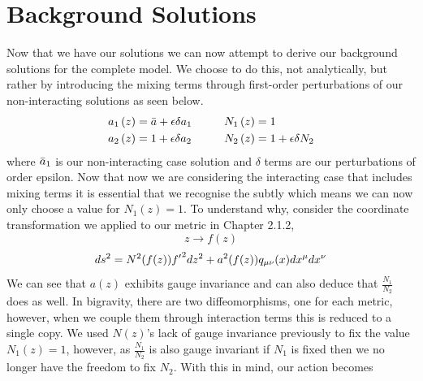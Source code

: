 \documentclass[11pt]{report}
\numberwithin{equation}{chapter}
\begin{document}
\section{Background Solutions}
Now that we have our solutions we can now attempt to derive our background solutions for the complete model. We choose to do this, not analytically, but rather by introducing the mixing terms through first-order perturbations of our non-interacting solutions as seen below.
\begin{equation}
\begin{aligned}[c]
    a_1\left(z\right)&=\Bar{a}+\epsilon\delta a_1 \hspace{1cm}\\
    a_2\left(z\right)&=1  +\epsilon\delta a_2
\end{aligned}
\begin{aligned}[c]
    N_1\left(z\right)&=1 \hspace{1cm}\\
    N_2\left(z\right)&=1+\epsilon\delta N_2
\end{aligned}
\end{equation}
where $\Bar{a}_1$ is our non-interacting case solution and $\delta$ terms are our perturbations of order epsilon. Now that now we are considering the interacting case that includes mixing terms it is essential that we recognise the subtly which means we can now only choose a value for $N_1(z)=1$. To understand why, consider the coordinate transformation we applied to our metric in Chapter 2.1.2,
\begin{equation}
    z\xrightarrow{}f(z)
\end{equation}
\begin{equation}
    ds^2=N^{2}(f(z)){f^\prime}^2 dz^{2} + a^{2}(f(z)) q_{\mu\nu}(x) dx^{\mu} dx^{\nu}\\   
\end{equation}
We can see that $a(z)$ exhibits gauge invariance and can also deduce that $\frac{N_1}{N_2}$ does as well. In bigravity, there are two diffeomorphisms, one for each metric, however, when we couple them through interaction terms this is reduced to a single copy. We used $N(z)$'s lack of gauge invariance previously to fix the value $N_1\left(z\right)=1$, however, as $\frac{N_1}{N_2}$ is also gauge invariant if $N_1$ is fixed then we no longer have the freedom to fix $N_2$. With this in mind, our action becomes
\end{document}
